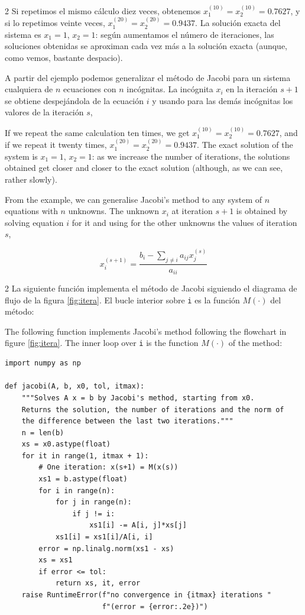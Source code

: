 \begin{paracol}{2}
Si repetimos el mismo cálculo diez veces, obtenemos $x_1^{(10)}=x_2^{(10)}=0.7627$, y si lo repetimos veinte veces, $x_1^{(20)}=x_2^{(20)}=0.9437$. La solución exacta del sistema es $x_1=1$, $x_2=1$: según aumentamos el número de iteraciones, las soluciones obtenidas se aproximan cada vez más a la solución exacta (aunque, como vemos, bastante despacio).

A partir del ejemplo podemos generalizar el método de Jacobi para un sistema cualquiera de $n$ ecuaciones con $n$ incógnitas. La incógnita $x_i$ en la iteración $s+1$ se obtiene despejándola de la ecuación $i$ y usando para las demás incógnitas los valores de la iteración $s$,

\switchcolumn
If we repeat the same calculation ten times, we get $x_1^{(10)}=x_2^{(10)}=0.7627$, and if we repeat it twenty times, $x_1^{(20)}=x_2^{(20)}=0.9437$. The exact solution of the system is $x_1=1$, $x_2=1$: as we increase the number of iterations, the solutions obtained get closer and closer to the exact solution (although, as we can see, rather slowly).

From the example, we can generalise Jacobi's method to any system of $n$ equations with $n$ unknowns. The unknown $x_i$ at iteration $s+1$ is obtained by solving equation $i$ for it and using for the other unknowns the values of iteration $s$,
\end{paracol}
\begin{equation*}
x_i^{(s+1)}=\frac{b_i-\sum_{j\neq i}a_{ij}x_j^{(s)}}{a_{ii}}
\end{equation*}

\begin{paracol}{2}
La siguiente función implementa el método de Jacobi siguiendo el diagrama de flujo de la figura \ref*{fig:itera}. El bucle interior sobre \texttt{i} es la función $M(\cdot)$ del método:

\switchcolumn
The following function implements Jacobi's method following the flowchart in figure \ref*{fig:itera}. The inner loop over \texttt{i} is the function $M(\cdot)$ of the method:
\end{paracol}
\begin{verbatim}
import numpy as np

def jacobi(A, b, x0, tol, itmax):
    """Solves A x = b by Jacobi's method, starting from x0.
    Returns the solution, the number of iterations and the norm of
    the difference between the last two iterations."""
    n = len(b)
    xs = x0.astype(float)
    for it in range(1, itmax + 1):
        # One iteration: x(s+1) = M(x(s))
        xs1 = b.astype(float)
        for i in range(n):
            for j in range(n):
                if j != i:
                    xs1[i] -= A[i, j]*xs[j]
            xs1[i] = xs1[i]/A[i, i]
        error = np.linalg.norm(xs1 - xs)
        xs = xs1
        if error <= tol:
            return xs, it, error
    raise RuntimeError(f"no convergence in {itmax} iterations "
                       f"(error = {error:.2e})")
\end{verbatim}

